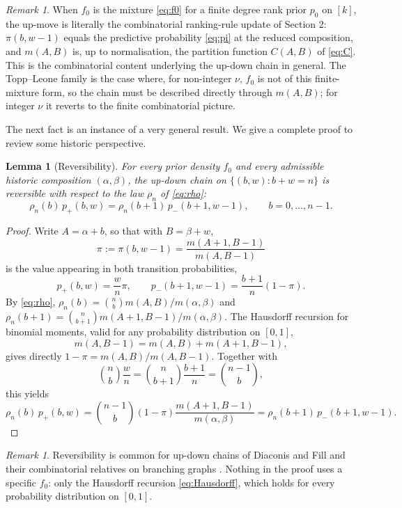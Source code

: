 \documentclass[11pt,reqno]{amsart}
\newtheorem{lemma}[theorem]{Lemma}
\theoremstyle{definition}
\theoremstyle{remark}
\newtheorem{remark}[theorem]{Remark}
\numberwithin{equation}{section}
\begin{document}
\begin{remark}
When \(f_0\) is the mixture \eqref{eq:f0} for a finite degree rank prior \(p_0\) on \([k]\), the up-move is literally the combinatorial ranking-rule update of Section 2: \(\pi(b,w-1)\) equals the predictive probability \eqref{eq:pi} at the reduced composition, and \(m(A,B)\) is, up to normalisation, the partition function \(C(A,B)\) of \eqref{eq:C}. This is the combinatorial content underlying the up-down chain in general. The Topp--Leone family is the case where, for non-integer \(\nu\), \(f_0\) is not of this finite-mixture form, so the chain must be described directly through \(m(A,B)\); for integer \(\nu\) it reverts to the finite combinatorial picture.
\end{remark}

The next fact is an instance of a very general result. We give a complete proof to review some historic perspective.

\begin{lemma}[Reversibility]
For every prior density \(f_0\) and every admissible historic composition \((\alpha,\beta)\), the up-down chain on \(\{(b,w):b+w=n\}\) is reversible with respect to the law \(\rho_n\) of \eqref{eq:rho}:
\[
\rho_n(b)\,p_+(b,w)=\rho_n(b+1)\,p_-(b+1,w-1),\qquad b=0,\dots,n-1.
\]
\end{lemma}

\begin{proof}
Write \(A=\alpha+b\), so that with \(B=\beta+w\),
\[
\pi:=\pi(b,w-1)=\frac{m(A+1,B-1)}{m(A,B-1)}
\]
is the value appearing in both transition probabilities,
\[
p_+(b,w)=\frac{w}{n}\pi,\qquad p_-(b+1,w-1)=\frac{b+1}{n}(1-\pi).
\]
By \eqref{eq:rho}, \(\rho_n(b)=\binom{n}{b}m(A,B)/m(\alpha,\beta)\) and \(\rho_n(b+1)=\binom{n}{b+1}m(A+1,B-1)/m(\alpha,\beta)\). The Hausdorff \cite{Hausdorff1921a,Hausdorff1921b} recursion for binomial moments, valid for any probability distribution on \([0,1]\),
\begin{equation}\label{eq:Hausdorff}
m(A,B-1)=m(A,B)+m(A+1,B-1),
\end{equation}
gives directly \(1-\pi=m(A,B)/m(A,B-1)\). Together with
\[
\binom{n}{b}\frac{w}{n}=\binom{n}{b+1}\frac{b+1}{n}=\binom{n-1}{b},
\]
this yields
\[
\rho_n(b)\,p_+(b,w)=\binom{n-1}{b}(1-\pi)\frac{m(A+1,B-1)}{m(\alpha,\beta)}=\rho_n(b+1)\,p_-(b+1,w-1).
\]
\end{proof}

\begin{remark}
Reversibility is common for up-down chains of Diaconis and Fill \cite{DiaconisFill1990} and their combinatorial relatives on branching graphs \cite{BorodinOlshanski2009,DongGnedinPitman2007,GnedinPitman2006,Petrov2013,Petrov2009}. Nothing in the proof uses a specific \(f_0\): only the Hausdorff recursion \eqref{eq:Hausdorff}, which holds for every probability distribution on \([0,1]\).
\end{remark}
\end{document}
